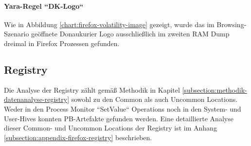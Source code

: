 \paragraph*{Yara-Regel ``DK-Logo``}
Wie in Abbildung \ref{chart:firefox-volatility-image} gezeigt, wurde das im Browsing-Szenario geöffnete Donaukurier Logo ausschließlich im zweiten RAM Dump dreimal in Firefox Prozessen gefunden.
\begin{table}[h!]
	\label{chart:firefox-volatility-image}
\end{table}




\subsection*{Registry}
\label{subsection:ergebnisse-firefox-registry}
Die Analyse der Registry zählt gemäß Methodik in Kapitel \ref{subsection:methodik-datenanalyse-registry} sowohl zu den Common als auch Uncommon Locations. Weder in den Process Monitor ``SetValue`` Operations noch in den System- und User-Hives konnten PB-Artefakte gefunden werden. Eine detaillierte Analyse dieser Common- und Uncommon Locations der Registry ist im Anhang \ref{subsection:appendix-firefox-registry} beschrieben.


